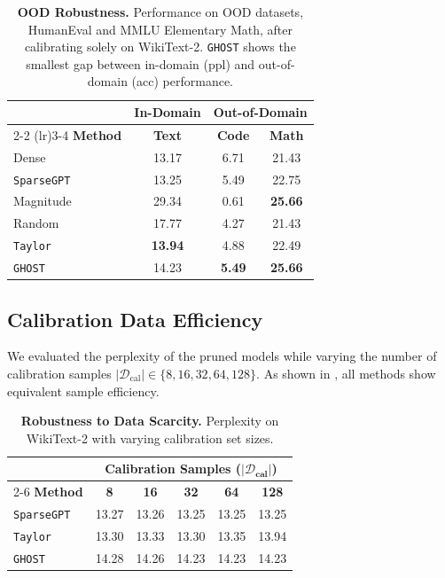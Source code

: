 \documentclass{article}
\theoremstyle{plain}
\theoremstyle{definition}
\theoremstyle{remark}
\begin{document}
\begin{table}[h]
\centering
\caption{\textbf{OOD Robustness.} Performance on OOD datasets, HumanEval and MMLU Elementary Math, after calibrating solely on WikiText-2. \texttt{GHOST} shows the smallest gap between in-domain (ppl) and out-of-domain (acc) performance.}
\label{tab:ood_robustness}
\begin{tabular}{lccc}
\toprule
& \textbf{In-Domain} & \multicolumn{2}{c}{\textbf{Out-of-Domain}} \\
\cmidrule(lr){2-2} \cmidrule(lr){3-4}
\textbf{Method} & \textbf{Text} & \textbf{Code} & \textbf{Math} \\
\midrule
Dense & 13.17 & 6.71 & 21.43 \\
\texttt{SparseGPT} & 13.25 & 5.49 & 22.75 \\
\midrule
Magnitude & 29.34 & 0.61 & \textbf{25.66} \\
Random & 17.77 & 4.27 & 21.43 \\
\texttt{Taylor} & \textbf{13.94} & 4.88 & 22.49 \\
\texttt{GHOST} & 14.23 & \textbf{5.49} & \textbf{25.66} \\
\bottomrule
\end{tabular}
\end{table}

\subsection{Calibration Data Efficiency}
\label{subsec:data_efficiency}

We evaluated the perplexity of the pruned models while varying the number of calibration samples $|\mathcal{D}_{\text{cal}}| \in \{8, 16, 32, 64, 128\}$. As shown in , all methods show equivalent sample efficiency.

\begin{table}[h]
\centering
\caption{\textbf{Robustness to Data Scarcity.} Perplexity on WikiText-2 with varying calibration set sizes.}
\label{tab:data_efficiency}
\begin{tabular}{lccccc}
\toprule
& \multicolumn{5}{c}{\textbf{Calibration Samples ($\bm{|\mathcal{D}_{\text{cal}}|}$)}} \\
\cmidrule(lr){2-6}
\textbf{Method} & \textbf{8} & \textbf{16} & \textbf{32} & \textbf{64} & \textbf{128} \\
\midrule
\texttt{SparseGPT} & 13.27 & 13.26 & 13.25 & 13.25 & 13.25 \\
\midrule
\texttt{Taylor}  & 13.30 & 13.33 & 13.30 & 13.35 & 13.94 \\
\texttt{GHOST} & 14.28 & 14.26 & 14.23 & 14.23 & 14.23 \\
\bottomrule
\end{tabular}
\end{table}
\end{document}
